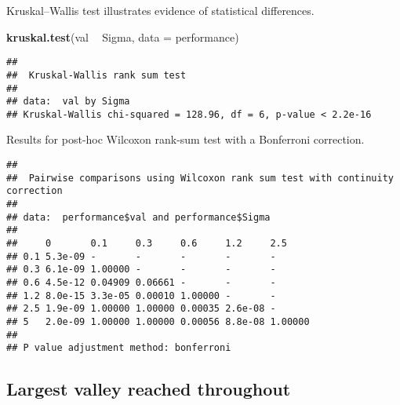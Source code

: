 \documentclass[]{book}
\newenvironment{Shaded}{\begin{snugshade}}{\end{snugshade}}
\newcommand{\DataTypeTok}[1]{\textcolor[rgb]{0.13,0.29,0.53}{#1}}
\newcommand{\KeywordTok}[1]{\textcolor[rgb]{0.13,0.29,0.53}{\textbf{#1}}}
\newcommand{\NormalTok}[1]{#1}
\newcommand{\OperatorTok}[1]{\textcolor[rgb]{0.81,0.36,0.00}{\textbf{#1}}}
\newcommand{\OtherTok}[1]{\textcolor[rgb]{0.56,0.35,0.01}{#1}}
\newcommand{\StringTok}[1]{\textcolor[rgb]{0.31,0.60,0.02}{#1}}
\begin{document}
Kruskal--Wallis test illustrates evidence of statistical differences.

\begin{Shaded}
\begin{Highlighting}[]
\KeywordTok{kruskal.test}\NormalTok{(val }\OperatorTok{~}\StringTok{ }\NormalTok{Sigma, }\DataTypeTok{data =}\NormalTok{ performance)}
\end{Highlighting}
\end{Shaded}

\begin{verbatim}
## 
##  Kruskal-Wallis rank sum test
## 
## data:  val by Sigma
## Kruskal-Wallis chi-squared = 128.96, df = 6, p-value < 2.2e-16
\end{verbatim}

Results for post-hoc Wilcoxon rank-sum test with a Bonferroni correction.

\begin{Shaded}
\end{Shaded}

\begin{verbatim}
## 
##  Pairwise comparisons using Wilcoxon rank sum test with continuity correction 
## 
## data:  performance$val and performance$Sigma 
## 
##     0       0.1     0.3     0.6     1.2     2.5    
## 0.1 5.3e-09 -       -       -       -       -      
## 0.3 6.1e-09 1.00000 -       -       -       -      
## 0.6 4.5e-12 0.04909 0.06661 -       -       -      
## 1.2 8.0e-15 3.3e-05 0.00010 1.00000 -       -      
## 2.5 1.9e-09 1.00000 1.00000 0.00035 2.6e-08 -      
## 5   2.0e-09 1.00000 1.00000 0.00056 8.8e-08 1.00000
## 
## P value adjustment method: bonferroni
\end{verbatim}

\hypertarget{largest-valley-reached-throughout-9}{%
\subsection{Largest valley reached throughout}\label{largest-valley-reached-throughout-9}}
\end{document}
